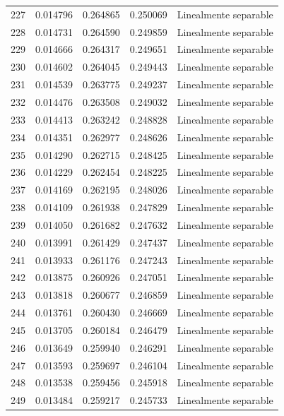 \begin{tabular}{lllll}
227 & 0.014796 & 0.264865 & 0.250069 & Linealmente separable \\
228 & 0.014731 & 0.264590 & 0.249859 & Linealmente separable \\
229 & 0.014666 & 0.264317 & 0.249651 & Linealmente separable \\
230 & 0.014602 & 0.264045 & 0.249443 & Linealmente separable \\
231 & 0.014539 & 0.263775 & 0.249237 & Linealmente separable \\
232 & 0.014476 & 0.263508 & 0.249032 & Linealmente separable \\
233 & 0.014413 & 0.263242 & 0.248828 & Linealmente separable \\
234 & 0.014351 & 0.262977 & 0.248626 & Linealmente separable \\
235 & 0.014290 & 0.262715 & 0.248425 & Linealmente separable \\
236 & 0.014229 & 0.262454 & 0.248225 & Linealmente separable \\
237 & 0.014169 & 0.262195 & 0.248026 & Linealmente separable \\
238 & 0.014109 & 0.261938 & 0.247829 & Linealmente separable \\
239 & 0.014050 & 0.261682 & 0.247632 & Linealmente separable \\
240 & 0.013991 & 0.261429 & 0.247437 & Linealmente separable \\
241 & 0.013933 & 0.261176 & 0.247243 & Linealmente separable \\
242 & 0.013875 & 0.260926 & 0.247051 & Linealmente separable \\
243 & 0.013818 & 0.260677 & 0.246859 & Linealmente separable \\
244 & 0.013761 & 0.260430 & 0.246669 & Linealmente separable \\
245 & 0.013705 & 0.260184 & 0.246479 & Linealmente separable \\
246 & 0.013649 & 0.259940 & 0.246291 & Linealmente separable \\
247 & 0.013593 & 0.259697 & 0.246104 & Linealmente separable \\
248 & 0.013538 & 0.259456 & 0.245918 & Linealmente separable \\
249 & 0.013484 & 0.259217 & 0.245733 & Linealmente separable \\
\bottomrule
\end{tabular}
